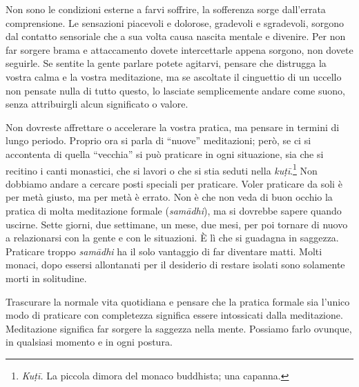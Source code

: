 Non sono le condizioni esterne a farvi soffrire, la sofferenza sorge
dall'errata comprensione. Le sensazioni piacevoli e dolorose, gradevoli
e sgradevoli, sorgono dal contatto sensoriale che a sua volta causa
nascita mentale e divenire. Per non far sorgere brama e attaccamento
dovete intercettarle appena sorgono, non dovete seguirle. Se sentite la
gente parlare potete agitarvi, pensare che distrugga la vostra calma e
la vostra meditazione, ma se ascoltate il cinguettio di un uccello non
pensate nulla di tutto questo, lo lasciate semplicemente andare come
suono, senza attribuirgli alcun significato o valore.

Non dovreste affrettare o accelerare la vostra pratica, ma pensare in
termini di lungo periodo. Proprio ora si parla di ``nuove'' meditazioni;
però, se ci si accontenta di quella ``vecchia'' si può praticare in ogni
situazione, sia che si recitino i canti monastici, che si lavori o che
si stia seduti nella \emph{kuṭī}.\footnote{\emph{Kuṭī.} La piccola
  dimora del monaco buddhista; una capanna.} Non dobbiamo andare a
cercare posti speciali per praticare. Voler praticare da soli è per metà
giusto, ma per metà è errato. Non è che non veda di buon occhio la
pratica di molta meditazione formale (\emph{samādhi}), ma si dovrebbe
sapere quando uscirne. Sette giorni, due settimane, un mese, due mesi,
per poi tornare di nuovo a relazionarsi con la gente e con le
situazioni. È lì che si guadagna in saggezza. Praticare troppo
\emph{samādhi} ha il solo vantaggio di far diventare matti. Molti
monaci, dopo essersi allontanati per il desiderio di restare isolati
sono solamente morti in solitudine.

Trascurare la normale vita quotidiana e pensare che la pratica formale
sia l'unico modo di praticare con completezza significa essere
intossicati dalla meditazione. Meditazione significa far sorgere la
saggezza nella mente. Possiamo farlo ovunque, in qualsiasi momento e in
ogni postura.

